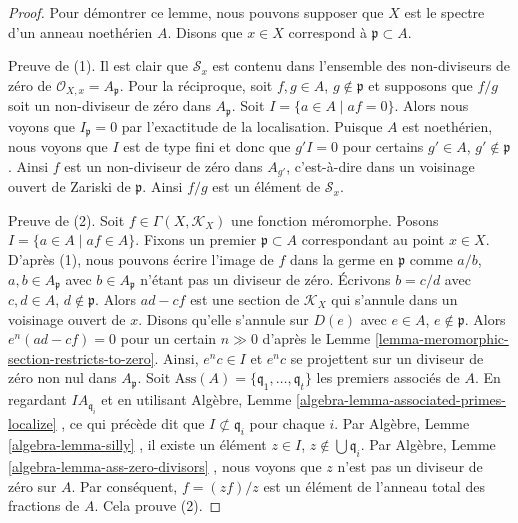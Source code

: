 \begin{proof}
Pour démontrer ce lemme, nous pouvons supposer que  $X$  est le spectre
d'un anneau noethérien  $A$. Disons que  $x \in X$  correspond à
 $\mathfrak p \subset A$.

\medskip\noindent
Preuve de (1). Il est clair que  $\mathcal{S}_x$  est contenu dans l'ensemble des
non-diviseurs de zéro de  $\mathcal{O}_{X, x} = A_\mathfrak p$. Pour la réciproque, soit  $f, g \in A$,
 $g \not \in \mathfrak p$  et supposons que  $f/g$  soit un non-diviseur de zéro dans
 $A_{\mathfrak p}$. Soit  $I = \{a \in A \mid af = 0\}$. Alors nous voyons que  $I_{\mathfrak p} = 0$  par
l'exactitude de la localisation. Puisque  $A$  est noethérien, nous voyons
que  $I$  est de type fini et donc que  $g'I = 0$  pour certains
 $g' \in A$,  $g' \not \in \mathfrak p$. Ainsi  $f$  est un non-diviseur de zéro dans
 $A_{g'}$, c'est-à-dire dans un voisinage ouvert de Zariski de  $\mathfrak p$.
Ainsi  $f/g$  est un élément de  $\mathcal{S}_x$.

\medskip\noindent
Preuve de (2). Soit  $f \in \Gamma(X, \mathcal{K}_X)$  une fonction méromorphe. Posons  $I = \{a \in A \mid af \in A\}$.
Fixons un premier  $\mathfrak p \subset A$  correspondant au point  $x \in X$. D'après (1),
nous pouvons écrire l'image de  $f$  dans la germe en  $\mathfrak p$  comme
 $a/b$,  $a, b \in A_{\mathfrak p}$  avec  $b \in A_{\mathfrak p}$  n'étant pas un diviseur de zéro.
Écrivons  $b = c/d$  avec  $c, d \in A$,  $d \not \in \mathfrak p$. Alors  $ad - cf$  est une
section de  $\mathcal{K}_X$  qui s'annule dans un voisinage ouvert de  $x$.
Disons qu'elle s'annule sur  $D(e)$  avec  $e \in A$,  $e \not \in \mathfrak p$. Alors
 $e^n(ad - cf) = 0$  pour un certain  $n \gg 0$  d'après le Lemme  \ref{lemma-meromorphic-section-restricts-to-zero}. Ainsi,
 $e^nc \in I$  et  $e^nc$  se projettent sur un diviseur de zéro non nul dans
 $A_{\mathfrak p}$. Soit  $\text{Ass}(A) = \{\mathfrak q_1, \ldots, \mathfrak q_t\}$  les premiers associés de  $A$. En
regardant  $IA_{\mathfrak q_i}$  et en utilisant Algèbre, Lemme  \ref{algebra-lemma-associated-primes-localize} , ce qui précède
dit que  $I \not \subset \mathfrak q_i$  pour chaque  $i$. Par Algèbre, Lemme  \ref{algebra-lemma-silly} , il
existe un élément  $z \in I$,  $z \not \in \bigcup \mathfrak q_i$. Par Algèbre, Lemme  \ref{algebra-lemma-ass-zero-divisors} ,
nous voyons que  $z$  n'est pas un diviseur de zéro sur  $A$. Par
conséquent,  $f = (zf)/z$  est un élément de l'anneau total des fractions de
 $A$. Cela prouve (2).
\end{proof}

